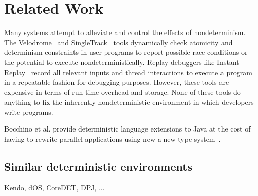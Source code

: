 
\section{Related Work}

Many systems attempt to alleviate and control the effects of nondeterminism.
The Velodrome~\cite{flanagan2008velodrome} and
SingleTrack~\cite{sadowski2009singletrack} tools dynamically check atomicity and
determinism constraints in user programs to report possible race conditions or
the potential to execute nondeterministically. Replay debuggers like Instant
Replay~\cite{leblanc1987debugging} record all relevant inputs and thread
interactions to execute a program in a repeatable fashion for debugging
purposes. However, these tools are expensive in terms of run time overhead and
storage. None of these tools do anything to fix the inherently
nondeterministic environment in which developers write programs.

Bocchino et al. provide deterministic language extensions to Java at the cost
of having to rewrite parallel applications using new a new type
system~\cite{bocchino2009type}.


\subsection{Similar deterministic environments}
Kendo, dOS, CoreDET, DPJ, ...

\endinput

